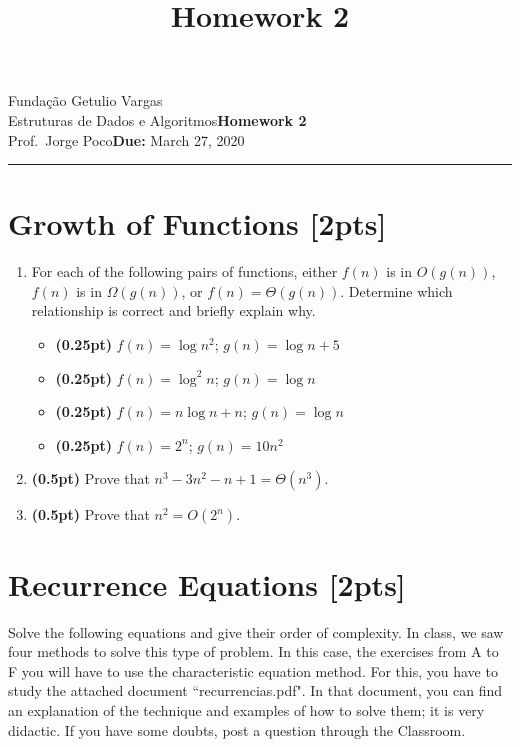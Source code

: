 \documentclass{article}
\title{Homework 2}
\date{}
\newcommand{\assignment}{Homework 2}
\newcommand{\duedate}{March 27, 2020}
\begin{document}
Fundação Getulio Vargas\hfill\\
Estruturas de Dados e Algoritmos\hfill\textbf{\assignment}\\
Prof.\ Jorge Poco\hfill\textbf{Due:} \duedate\\
\smallskip\hrule\bigskip

{\let\newpage\relax\maketitle}
\maketitle


\section{Growth of Functions [2pts]}

\begin{enumerate}[label=\Alph*]
  \item For each of the following pairs of functions, either $f(n)$ is in $O(g(n))$, $f(n)$ is in $\Omega(g(n))$, or $f(n) = \Theta(g(n))$. Determine which relationship is correct and briefly explain why.
    \begin{itemize}
      \item \textbf{(0.25pt)} $f(n) = \log n^2$; $g(n) = \log n + 5$
      \item \textbf{(0.25pt)} $f(n) = \log^2 n$; $g(n) = \log n$
      \item \textbf{(0.25pt)} $f(n) = n\log n + n$; $g(n) = \log n$
      \item \textbf{(0.25pt)} $f(n) = 2^n$; $g(n) = 10n^2$
    \end{itemize}
  
  \item \textbf{(0.5pt)} Prove that $n^3 -3n^2 -n+1 = \Theta(n^3)$.
  \item \textbf{(0.5pt)} Prove that $n^2 = O(2^n)$.
  
\end{enumerate}

\section{Recurrence Equations [2pts]}
Solve the following equations and give their order of complexity.
In class, we saw four methods to solve this type of problem. In this case, the exercises from A to F you will have to use the characteristic equation method. For this, you have to study the attached document ``recurrencias.pdf". In that document, you can find an explanation of the technique and examples of how to solve them; it is very didactic. If you have some doubts, post a question through the Classroom.
\end{document}
